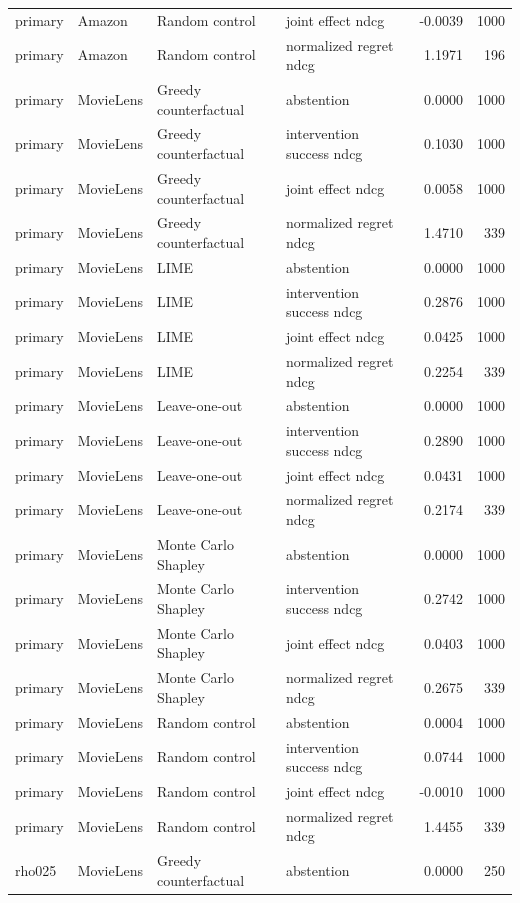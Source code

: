 \begin{longtable}{@{}p{}p{}p{}p{}rr@{}}
primary & Amazon & Random control & joint effect ndcg & -0.0039 & 1000 \\
primary & Amazon & Random control & normalized regret ndcg & 1.1971 & 196 \\
primary & MovieLens & Greedy counterfactual & abstention & 0.0000 & 1000 \\
primary & MovieLens & Greedy counterfactual & intervention success ndcg & 0.1030 & 1000 \\
primary & MovieLens & Greedy counterfactual & joint effect ndcg & 0.0058 & 1000 \\
primary & MovieLens & Greedy counterfactual & normalized regret ndcg & 1.4710 & 339 \\
primary & MovieLens & LIME & abstention & 0.0000 & 1000 \\
primary & MovieLens & LIME & intervention success ndcg & 0.2876 & 1000 \\
primary & MovieLens & LIME & joint effect ndcg & 0.0425 & 1000 \\
primary & MovieLens & LIME & normalized regret ndcg & 0.2254 & 339 \\
primary & MovieLens & Leave-one-out & abstention & 0.0000 & 1000 \\
primary & MovieLens & Leave-one-out & intervention success ndcg & 0.2890 & 1000 \\
primary & MovieLens & Leave-one-out & joint effect ndcg & 0.0431 & 1000 \\
primary & MovieLens & Leave-one-out & normalized regret ndcg & 0.2174 & 339 \\
primary & MovieLens & Monte Carlo Shapley & abstention & 0.0000 & 1000 \\
primary & MovieLens & Monte Carlo Shapley & intervention success ndcg & 0.2742 & 1000 \\
primary & MovieLens & Monte Carlo Shapley & joint effect ndcg & 0.0403 & 1000 \\
primary & MovieLens & Monte Carlo Shapley & normalized regret ndcg & 0.2675 & 339 \\
primary & MovieLens & Random control & abstention & 0.0004 & 1000 \\
primary & MovieLens & Random control & intervention success ndcg & 0.0744 & 1000 \\
primary & MovieLens & Random control & joint effect ndcg & -0.0010 & 1000 \\
primary & MovieLens & Random control & normalized regret ndcg & 1.4455 & 339 \\
rho025 & MovieLens & Greedy counterfactual & abstention & 0.0000 & 250 \\

\end{longtable}
